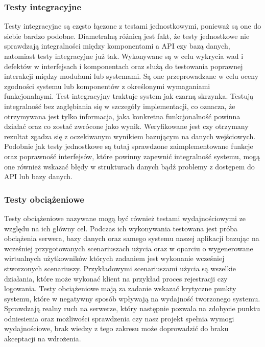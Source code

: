 \documentclass[oneside,polski,logo]{amuthesis}
\begin{document}
\subsubsection {Testy integracyjne}
Testy integracyjne są często łączone z testami jednostkowymi, ponieważ są one do siebie bardzo podobne. Diametralną różnicą jest fakt, że testy jednostkowe nie sprawdzają integralności między komponentami a API czy bazą danych, natomiast testy integracyjne już tak. Wykonywane są w celu wykrycia wad i defektów w interfejsach i komponentach oraz służą do testowania poprawnej interakcji między modułami lub systemami. Są one przeprowadzane w celu oceny zgodności systemu lub komponentów z określonymi wymaganiami funkcjonalnymi. Test integracyjny traktuje system jak czarną skrzynka. Testują integralność bez zagłębiania się w szczegóły implementacji, co oznacza, że otrzymywana jest tylko informacja, jaka konkretna funkcjonalność powinna działać oraz co zostać zwrócone jako wynik. Weryfikowane jest czy otrzymany rezultat zgadza się z oczekiwanym wynikiem bazującym na danych wejściowych. Podobnie jak testy jednostkowe są tutaj sprawdzone zaimplementowane funkcje oraz poprawność interfejsów, które powinny zapewnić integralność systemu, mogą one również wskazać błędy w strukturach danych bądź problemy z dostępem do API lub bazy danych.\cite{testI}\\

\subsubsection {Testy obciążeniowe}
Testy obciążeniowe nazywane mogą być również testami wydajnościowymi ze względu na ich główny cel. Podczas ich wykonywania testowana jest próba obciążenia serwera, bazy danych oraz samego systemu naszej aplikacji bazując na wcześniej przygotowanych scenariuszach użycia oraz w oparciu o wygenerowane wirtualnych użytkowników których zadaniem jest wykonanie wcześniej stworzonych scenariuszy. Przykładowymi scenariuszami użycia są wszelkie działania, które może wykonać klient na przykład proces rejestracji czy logowania. Testy obciążeniowe mają za zadanie wskazać krytyczne punkty systemu, które w negatywny sposób wpływają na wydajność tworzonego systemu. Sprawdzają realny ruch na serwerze, który następnie pozwala na zdobycie punktu odniesienia oraz możliwości sprawdzenia czy nasz projekt spełnia wymogi wydajnościowe, brak wiedzy z tego zakresu może doprowadzić do braku akceptacji na wdrożenia.\cite{testO}\\
\end{document}
